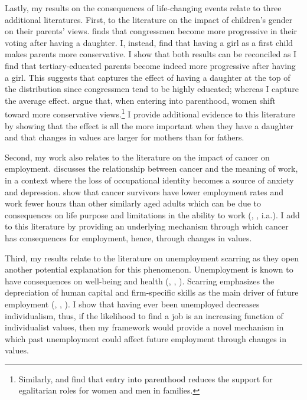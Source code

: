 Lastly, my results on the consequences of life-changing events relate to three additional literatures. First, to the literature on the impact of children's gender on their parents' views.
\citet{Washington2008Female} finds that congressmen become more progressive in their voting after having a daughter. I, instead, find that having a girl as a first child makes parents more conservative. I show that both results can be reconciled as I find that tertiary-educated parents become indeed more progressive after having a girl. This suggests that \citet{Washington2008Female} captures the effect of having a daughter at the top of the distribution since congressmen tend to be highly educated; whereas I capture the average effect.
\citet{Grinza2017Entry} argue that, when entering into parenthood, women shift toward more conservative views.\footnote{Similarly, \citet{Bolzendahl2004Feminist} and \citet{Cunningham2005Reciprocal} find that entry into parenthood reduces the support for egalitarian roles for women and men in families.}
I provide additional evidence to this literature by showing that the effect is all the more important when they have a daughter and that changes in values are larger for mothers than for fathers.

Second, my work also relates to the literature on the impact of cancer on employment.
\citet{Peteet2000Cancer} discusses the relationship between cancer and the meaning of work, in a context where the loss of occupational identity becomes a source of anxiety and depression. \citet{Moran2011Long} show that cancer survivors have lower employment rates and work fewer hours than other similarly aged adults which can be due to consequences on life purpose and limitations in the ability to work (\citealt{Short2005Employment, Short2008Work, Short2008Long}, \citealt{Bradley2002Breast, Bradley2005Short}, i.a.). I add to this literature by providing an underlying mechanism through which cancer has consequences for employment, hence, through changes in values.

Third, my results relate to the literature on unemployment scarring as they open another potential explanation for this phenomenon. Unemployment is known to have consequences on well-being and health (\citealt{Clark1994Unhappiness}, \citealt{Knabe2010Dissatisfied}, \citealt{Nordt2015Modelling}). Scarring emphasizes the depreciation of human capital and firm-specific skills as the main driver of future employment (\citealt{Arulampalam2001Unemployment}, \citealt{Clark2001Scarring}, \citealt{Gregg2005Wage}). I show that having ever been unemployed decreases individualism, thus, if the likelihood to find a job is an increasing function of individualist values, then my framework would provide a novel mechanism in which past unemployment could affect future employment through changes in values.

